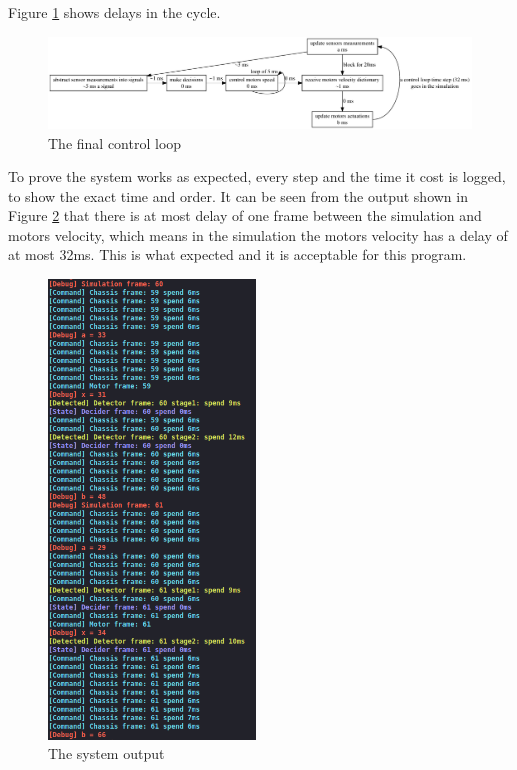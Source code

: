 Figure \ref{fig:final_control_loop} shows delays in the cycle.

\begin{figure}[htbp]
    \centering
    \includegraphics[width=14cm]{implementation/img_song/final_control_loop.pdf}
    \caption{The final control loop}
    \label{fig:final_control_loop}
\end{figure}

To prove the system works as expected, every step and the time it cost is logged, to show the exact time and order. It can be seen from the output shown in Figure \ref{fig:system_output} that there is at most delay of one frame between the simulation and motors velocity, which means in the simulation the motors velocity has a delay of at most 32ms. This is what expected and it is acceptable for this program.

\begin{figure}[htbp]
    \centering
    \includegraphics[width=5.5cm]{implementation/img_song/output.png}
    \caption{The system output}
    \label{fig:system_output}
\end{figure}